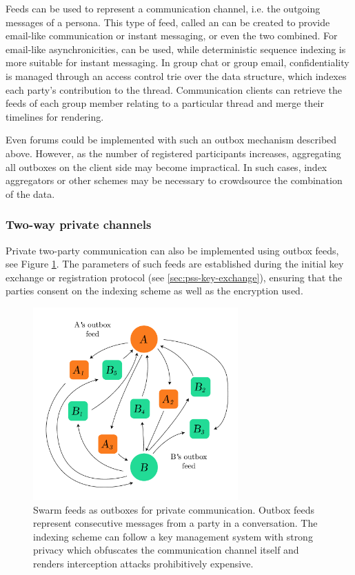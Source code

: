 Feeds can be used to represent a communication channel, i.e. the outgoing messages of a persona. This type of feed, called an  can be created to provide email-like communication or instant messaging, or even the two combined. For email-like asynchronicities,  can be used, while deterministic sequence indexing is more suitable for instant messaging. 
In group chat or group email, confidentiality is managed through an access control trie over the data structure, which indexes each party's contribution to the thread. Communication clients can retrieve the feeds of each group member relating to a particular thread and merge their timelines for rendering. 

Even forums could be implemented with such an outbox mechanism described above. However, as the number of registered participants increases, aggregating all outboxes on the client side may become impractical. In such cases, index aggregators or other schemes may be necessary to crowdsource the combination of the data.

\subsubsection{Two-way private channels}
 
Private two-party communication can also be implemented using outbox feeds, see Figure \ref{fig:feeds-as-channel}. The parameters of such feeds are established during the initial key exchange or registration protocol (see \ref{sec:pss-key-exchange}), ensuring that the parties consent on the indexing scheme as well as the encryption used. 


\begin{figure}[htbp]
  \centering
  \includegraphics[width=0.7\textwidth]{fig/feeds-as-channel.pdf}  
  \caption[Swarm feeds as outboxes \statusgreen]{Swarm feeds as outboxes for private communication. Outbox feeds represent consecutive messages from a party in a conversation. The indexing scheme can follow a key management system with strong privacy which obfuscates the communication channel itself and renders interception attacks prohibitively expensive.}
\label{fig:feeds-as-channel}
\end{figure}


